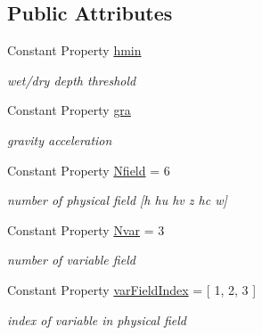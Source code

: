 \subsection*{Public Attributes}
\begin{DoxyCompactItemize}
\item 
Constant Property \hyperlink{class_s_w_e_abstract2d_aa71f664c0b325e62ce72324a66a55664}{hmin}
\begin{DoxyCompactList}\small\item\em wet/dry depth threshold \end{DoxyCompactList}\item 
Constant Property \hyperlink{class_s_w_e_abstract2d_a2a779d550274f8b90d70da870765feba}{gra}
\begin{DoxyCompactList}\small\item\em gravity acceleration \end{DoxyCompactList}\item 
Constant Property \hyperlink{class_s_w_e_abstract2d_a25090128dc6b6957dcc45d9aab4fc955}{Nfield} = 6
\begin{DoxyCompactList}\small\item\em number of physical field \mbox{[}h hu hv z hc w\mbox{]} \end{DoxyCompactList}\item 
Constant Property \hyperlink{class_s_w_e_abstract2d_ab00cd850ebe6ed4bbbafb962486be75a}{Nvar} = 3
\begin{DoxyCompactList}\small\item\em number of variable field \end{DoxyCompactList}\item 
Constant Property \hyperlink{class_s_w_e_abstract2d_acf32686e87b2e26339f28ec095929713}{var\+Field\+Index} = \mbox{[} 1, 2, 3 \mbox{]}
\begin{DoxyCompactList}\small\item\em index of variable in physical field \end{DoxyCompactList}\end{DoxyCompactItemize}
